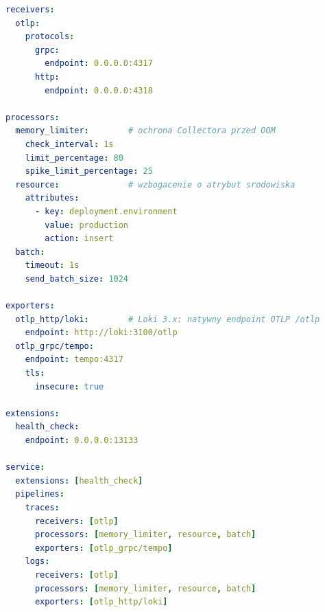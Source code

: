 \begin{lstlisting}[language=yaml, caption={Konfiguracja OpenTelemetry Collector: potoki logów i~śladów; metryki pobiera bezpośrednio Prometheus (infrastructure/helm/observability/files/otel-collector-config.yaml)}, label={lst:otel-collector-config}]
receivers:
  otlp:
    protocols:
      grpc:
        endpoint: 0.0.0.0:4317
      http:
        endpoint: 0.0.0.0:4318

processors:
  memory_limiter:        # ochrona Collectora przed OOM
    check_interval: 1s
    limit_percentage: 80
    spike_limit_percentage: 25
  resource:              # wzbogacenie o atrybut srodowiska
    attributes:
      - key: deployment.environment
        value: production
        action: insert
  batch:
    timeout: 1s
    send_batch_size: 1024

exporters:
  otlp_http/loki:        # Loki 3.x: natywny endpoint OTLP /otlp
    endpoint: http://loki:3100/otlp
  otlp_grpc/tempo:
    endpoint: tempo:4317
    tls:
      insecure: true

extensions:
  health_check:
    endpoint: 0.0.0.0:13133

service:
  extensions: [health_check]
  pipelines:
    traces:
      receivers: [otlp]
      processors: [memory_limiter, resource, batch]
      exporters: [otlp_grpc/tempo]
    logs:
      receivers: [otlp]
      processors: [memory_limiter, resource, batch]
      exporters: [otlp_http/loki]
\end{lstlisting}


